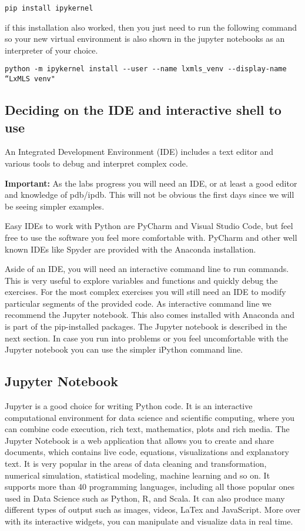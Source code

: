 \texttt{pip install ipykernel}

if this installation also worked, then you just need to run the following command so your new virtual environment is also shown in the jupyter notebooks as an interpreter of your choice.

\texttt{python -m ipykernel install -{}-user -{}-name lxmls\_venv -{}-display-name ``LxMLS venv"}


\subsection{Deciding on the IDE and interactive shell to use}

An Integrated Development Environment (IDE) includes a text editor and various tools to debug and interpret complex code. 

\textbf{Important:} As the labs progress you will need an IDE, or at least a good editor and knowledge of pdb/ipdb. This will not be obvious the first days since we will be seeing simpler examples.

Easy IDEs to work with Python are PyCharm and Visual Studio Code, but feel free to use the software you feel more comfortable with. PyCharm and other well known IDEs like Spyder are provided with the Anaconda installation.

Aside of an IDE, you will need an interactive command line to run commands. This is very useful to explore variables and functions and quickly debug the exercises. For the most complex exercises you will still need an IDE to modify particular segments of the provided code. As interactive command line we recommend the Jupyter notebook. This also comes installed with Anaconda and is part of the pip-installed packages. The Jupyter notebook is described in the next section. In case you run into problems or you feel uncomfortable with the Jupyter notebook you can use the simpler iPython command line.

\subsection{Jupyter Notebook}

Jupyter is a good choice for writing Python code. It is an interactive computational environment for data science and scientific computing, where you can combine code execution, rich text, mathematics, plots and rich media. The Jupyter Notebook is a web application that allows you to create and share documents, which contains live code, equations, visualizations and explanatory text. It is very popular in the areas of data cleaning and transformation, numerical simulation, statistical modeling, machine learning and so on. It supports more than 40 programming languages, including all those popular ones used in Data Science such as Python, R, and Scala. It can also produce many different types of output such as images, videos, LaTex and JavaScript. More over with its interactive widgets, you can manipulate and visualize data in real time.

